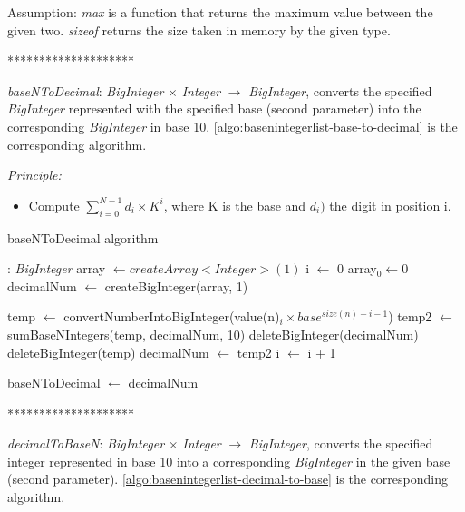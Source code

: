 \documentclass[book, nodocumentinfo]{upmethodology-document}
\newcommand{\separator}{\centerline{********************}}
\begin{document}
Assumption: \emph{max} is a function that returns the maximum value between the given two.
\emph{sizeof} returns the size taken in memory by the given type.

\separator

\emph{baseNToDecimal}: \emph{BigInteger} \(×\) \emph{Integer} \(\rightarrow\) \emph{BigInteger},
converts the specified \emph{BigInteger} represented with the specified base (second parameter)
into the corresponding \emph{BigInteger} in base 10.
\ref{algo:basenintegerlist-base-to-decimal} is the corresponding algorithm.

\emph{Principle:}
\begin{itemize}
    \item Compute \(\sum\limits_{i=0}^{N - 1}{d_i \times K^i}\), where K is the base and \(d_i)\) the digit in position i.
\end{itemize}

\begin{algorithm}[H]
    \caption{baseNToDecimal algorithm}
    \label{algo:basenintegerlist-base-to-decimal}

    \begin{algorithmic}
         : \emph{BigInteger}
            \State array \(\leftarrow createArray<Integer>(1)\)
            \State i \(\leftarrow\) 0
            \State array\(_0 \leftarrow 0\)
            \State decimalNum \(\leftarrow\) createBigInteger(array, 1)

                \State temp \(\leftarrow\) convertNumberIntoBigInteger(value(n)\(_i × base^{size(n) - i - 1}\))
                \State temp2 \(\leftarrow\) sumBaseNIntegers(temp, decimalNum, 10)
                \Sate deleteBigInteger(decimalNum)
                \State deleteBigInteger(temp)
                \State decimalNum \(\leftarrow\) temp2
                \State i \(\leftarrow\) i + 1
            \EndWhile

            \State baseNToDecimal \(\leftarrow\) decimalNum
        \EndFunction
    \end{algorithmic}
\end{algorithm}

\separator

\emph{decimalToBaseN}: \emph{BigInteger} \(×\) \emph{Integer} \(\rightarrow\) \emph{BigInteger},
converts the specified integer represented in base 10 into a corresponding \emph{BigInteger} in
the given base (second parameter).
\ref{algo:basenintegerlist-decimal-to-base} is the corresponding algorithm.
\end{document}
